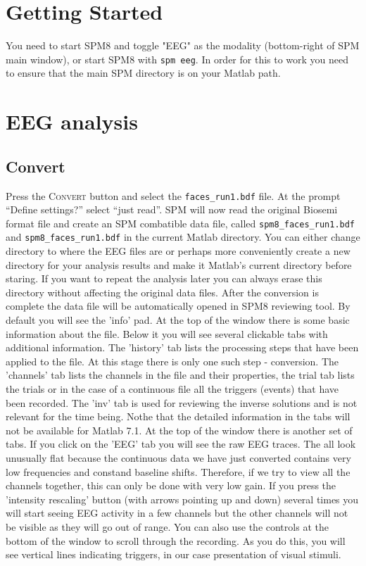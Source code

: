 \section{Getting Started}

You need to start SPM8 and toggle "EEG" as the modality (bottom-right of SPM main window), or start SPM8 with \verb!spm eeg!. In order for this to work you need to ensure that the main SPM directory is on your Matlab path.


\section{EEG analysis}

\subsection{Convert}

Press the \textsc{Convert} button and select the \texttt{faces_run1.bdf} file. At the prompt ``Define settings?'' select ``just read''.
SPM will now read the original Biosemi format file and create an SPM combatible data file, called \texttt{spm8\_faces_run1.bdf} and \texttt{spm8\_faces_run1.bdf} in the current Matlab directory. You can either change directory to where the EEG files are or perhaps more conveniently create a new directory for your analysis results and make it Matlab's current directory before staring. If you want to repeat the analysis later you can always erase this directory without affecting the original data files. After the conversion is complete the data file will be automatically opened in SPM8 reviewing tool. By default you will see the 'info' pad. At the top of the window there is some basic information about the file. Below it you will see several clickable tabs with additional information. The 'history' tab lists the processing steps that have been applied to the file. At this stage there is only one such step - conversion. The 'channels' tab lists the channels in the file and their properties, the trial tab lists the trials or in the case of a continuous file all the triggers (events) that have been recorded. The 'inv' tab is used for reviewing the inverse solutions and is not relevant for the time being. Nothe that the detailed information in the tabs will not be available for Matlab 7.1.  At the top of the window there is another set of tabs. If you click on the 'EEG' tab you will see the raw EEG traces. The all look unusually flat because the continuous data we have just converted contains very low frequencies and constand baseline shifts. Therefore, if we try to view all the channels together, this can only be done with very low gain. 
If you press the 'intensity rescaling' button (with arrows pointing up and down) several times you will start seeing EEG activity in a few channels but the other channels will not be visible as they will go out of range. You can also use the controls at the bottom of the window to scroll through the recording. As you do this, you will see vertical lines indicating triggers, in our case presentation of visual stimuli. 

